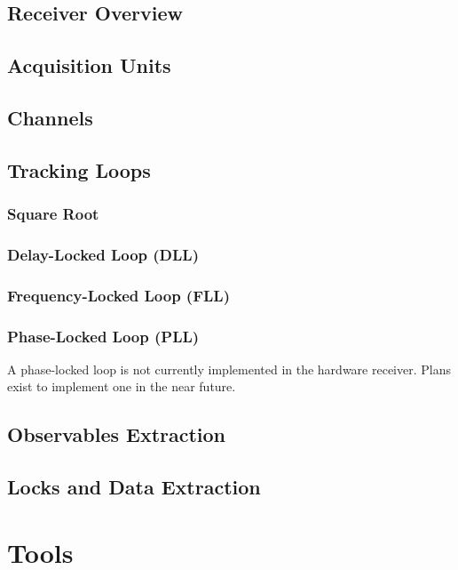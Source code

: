 \documentclass[12pt]{article}
\begin{document}
\subsection{Receiver Overview}

\subsection{Acquisition Units}

\subsection{Channels}

\subsection{Tracking Loops}

\subsubsection{Square Root}

\subsubsection{Delay-Locked Loop (DLL)}

\subsubsection{Frequency-Locked Loop (FLL)}

\subsubsection{Phase-Locked Loop (PLL)}
A phase-locked loop is not currently implemented in the hardware receiver. Plans exist to implement one in the near future.

\subsection{Observables Extraction}

\subsection{Locks and Data Extraction}

\section{Tools}
\end{document}
